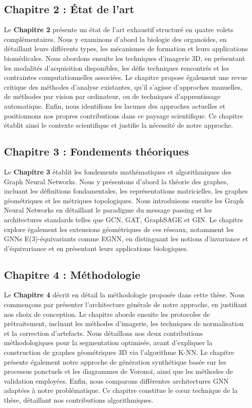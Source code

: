 \subsection{Chapitre 2 : État de l'art}

Le \textbf{Chapitre 2} présente un état de l'art exhaustif structuré en quatre volets complémentaires. Nous y examinons d'abord la biologie des organoïdes, en détaillant leurs différents types, les mécanismes de formation et leurs applications biomédicales. Nous abordons ensuite les techniques d'imagerie 3D, en présentant les modalités d'acquisition disponibles, les défis techniques rencontrés et les contraintes computationnelles associées. Le chapitre propose également une revue critique des méthodes d'analyse existantes, qu'il s'agisse d'approches manuelles, de méthodes par vision par ordinateur, ou de techniques d'apprentissage automatique. Enfin, nous identifions les lacunes des approches actuelles et positionnons nos propres contributions dans ce paysage scientifique. Ce chapitre établit ainsi le contexte scientifique et justifie la nécessité de notre approche.

\subsection{Chapitre 3 : Fondements théoriques}

Le \textbf{Chapitre 3} établit les fondements mathématiques et algorithmiques des Graph Neural Networks. Nous y présentons d'abord la théorie des graphes, incluant les définitions fondamentales, les représentations matricielles, les graphes géométriques et les métriques topologiques. Nous introduisons ensuite les Graph Neural Networks en détaillant le paradigme du message passing et les architectures standards telles que GCN, GAT, GraphSAGE et GIN. Le chapitre explore également les extensions géométriques de ces réseaux, notamment les GNNs E(3)-équivariants comme EGNN, en distinguant les notions d'invariance et d'équivariance et en présentant leurs applications biologiques.

\subsection{Chapitre 4 : Méthodologie}

Le \textbf{Chapitre 4} décrit en détail la méthodologie proposée dans cette thèse. Nous commençons par présenter l'architecture générale de notre approche, en justifiant nos choix de conception. Le chapitre aborde ensuite les protocoles de prétraitement, incluant les méthodes d'imagerie, les techniques de normalisation et la correction d'artefacts. Nous détaillons nos deux contributions méthodologiques pour la segmentation optimisée, avant d'expliquer la construction de graphes géométriques 3D via l'algorithme K-NN. Le chapitre présente également notre approche de génération synthétique basée sur les processus ponctuels et les diagrammes de Voronoï, ainsi que les méthodes de validation employées. Enfin, nous comparons différentes architectures GNN adaptées à notre problématique. Ce chapitre constitue le cœur technique de la thèse, détaillant nos contributions algorithmiques.

